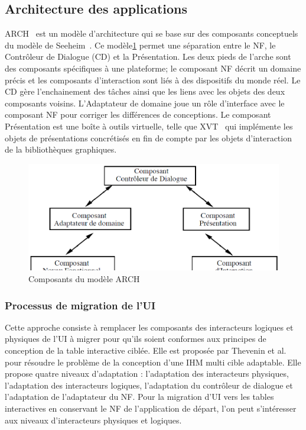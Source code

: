 \subsection{Architecture des applications}
\label{sec:chap2:4:1}
ARCH~\cite{UIMS1992} est un modèle d'architecture qui se base sur des composants conceptuels du modèle de Seeheim~\cite{Pfaff1985}. Ce modèle\ref{fig:chap2:7} permet une séparation entre le NF, le Contrôleur de Dialogue (CD) et la Présentation. Les deux pieds de l'arche sont des composants spécifiques à une plateforme; le composant NF décrit un domaine précis et les composants d'interaction sont liés à des dispositifs du monde réel. Le CD gère l'enchainement des tâches ainsi que les liens avec les objets des deux composants voisins. L'Adaptateur de domaine joue un rôle d'interface avec le composant NF pour corriger les différences de conceptions. Le composant Présentation est une boîte à outils virtuelle, telle que XVT~\cite{Valdes1989} qui implémente les objets de présentations concrétisés en fin de compte par les objets d'interaction de la bibliothèques graphiques. 
\begin{figure}[ht]
\begin{center}
\caption{Composants du modèle ARCH}
\label{fig:chap2:7}
\includegraphics[scale=0.7]{chap3/img-9}
\end{center}
\end{figure}
\subsubsection{Processus de migration de l'UI}
Cette approche consiste à remplacer les composants des interacteurs logiques et physiques de l'UI à migrer pour qu'ils soient conformes aux principes de conception de la table interactive ciblée. Elle est proposée par Thevenin et al. ~\cite{Thevenin2002} pour résoudre le problème de la conception d'une IHM multi cible adaptable. Elle propose quatre niveaux d'adaptation : l'adaptation des interacteurs physiques, l'adaptation des interacteurs logiques, l'adaptation du contrôleur de dialogue et l'adaptation de l'adaptateur du NF. Pour la migration d'UI vers les tables interactives en conservant le NF de l'application de départ, l'on peut s'intéresser aux niveaux d'interacteurs physiques et logiques.

